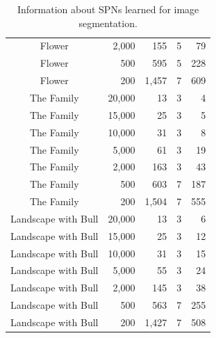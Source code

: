 \begin{table}
\begin{tabular}{crrrr}
    Flower              & 2,000                   & 155             & 5                & 79                 \\
    Flower              & 500                     & 595             & 5                & 228                \\
    Flower              & 200                     & 1,457           & 7                & 609                \\ \midrule
    The Family          & 20,000                  & 13              & 3                & 4                  \\
    The Family          & 15,000                  & 25              & 3                & 5                  \\
    The Family          & 10,000                  & 31              & 3                & 8                  \\
    The Family          & 5,000                   & 61              & 3                & 19                 \\
    The Family          & 2,000                   & 163             & 3                & 43                 \\
    The Family          & 500                     & 603             & 7                & 187                \\
    The Family          & 200                     & 1,504           & 7                & 555                \\ \midrule
    Landscape with Bull & 20,000                  & 13              & 3                & 6                  \\
    Landscape with Bull & 15,000                  & 25              & 3                & 12                 \\
    Landscape with Bull & 10,000                  & 31              & 3                & 15                 \\
    Landscape with Bull & 5,000                   & 55              & 3                & 24                 \\
    Landscape with Bull & 2,000                   & 145             & 3                & 38                 \\
    Landscape with Bull & 500                     & 563             & 7                & 255                \\
    Landscape with Bull & 200                     & 1,427           & 7                & 508                \\
    \bottomrule
  \end{tabular}

  \caption[Information about SPNs learned for image segmentation]{Information about SPNs learned for image segmentation.}
  \label{tab:segstats}
\end{table}

